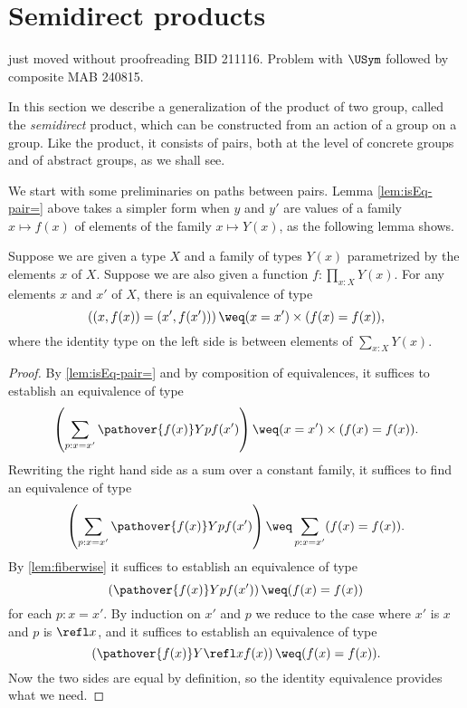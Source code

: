 \section{Semidirect products}
\label{sec:Semidirect-products}{\color{red} just moved without proofreading BID 211116. Problem with $\USym$ followed by composite MAB 240815.}

In this section we describe a generalization of the product of two group, called the {\em semidirect} product, which can be constructed from an
action of a group on a group.  Like the product, it consists of pairs, both at the level of concrete groups and of abstract groups, as we shall
see.

We start with some preliminaries on paths between pairs.
Lemma \cref{lem:isEq-pair=} above takes a simpler form when $y$ and $y'$ are values of a family $x \mapsto f(x)$
of elements of the family $x \mapsto Y(x)$, as the following lemma shows.

\begin{lemma}\label{lem:pathpairsection}
  Suppose we are given a type $X$ and a family of types $Y(x)$ parametrized by the elements $x$ of $X$.
  Suppose we are also given a function $f : \prod_{x:X} Y(x)$.
  For any elements $x$ and $x'$ of $X$,
  there is an equivalence of type
  $$\left ( (x,f(x)) = (x',f(x')) \right ) \weq (x=x') \times (f(x) = f(x)),$$
  where the identity type on the left side is between elements of $\sum_{x:X} Y(x)$.
\end{lemma}

\begin{proof}
  By \cref{lem:isEq-pair=} and by composition of equivalences, it suffices to establish an equivalence of type
  $$\left( \sum_{p:x=x'} \pathover {f(x)} Y p {f(x')} \right) \weq (x=x') \times (f(x) = f(x)).$$
  Rewriting the right hand side as a sum over a constant family, it suffices to find an equivalence of type
  $$\left( \sum_{p:x=x'} \pathover {f(x)} Y p {f(x')} \right) \weq \sum_{p:x=x'} (f(x) = f(x)).$$
  By \cref{lem:fiberwise} it suffices to establish an equivalence of type
  $$ \left( \pathover {f(x)} Y p {f(x')} \right) \weq (f(x) = f(x))$$
  for each $p:x=x'$.  By induction on $x'$ and $p$ we reduce to the case where $x'$ is $x$ and $p$ is $\refl x$, and it suffices to establish an
  equivalence of type
  $$ \left( \pathover {f(x)} Y {\refl x} {f(x)} \right) \weq (f(x) = f(x)).$$
  Now the two sides are equal by definition, so the identity equivalence provides what we need.
\end{proof}


